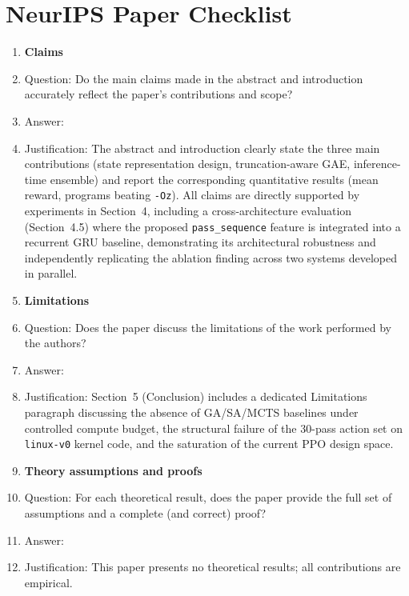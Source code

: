 \section*{NeurIPS Paper Checklist}

\begin{enumerate}

\item {\bf Claims}
    \item[] Question: Do the main claims made in the abstract and introduction accurately reflect the paper's contributions and scope?
    \item[] Answer: \answerYes{}
    \item[] Justification: The abstract and introduction clearly state the three main contributions (state representation design, truncation-aware GAE, inference-time ensemble) and report the corresponding quantitative results (mean reward, programs beating \texttt{-Oz}). All claims are directly supported by experiments in Section~4, including a cross-architecture evaluation (Section~4.5) where the proposed \texttt{pass\_sequence} feature is integrated into a recurrent GRU baseline, demonstrating its architectural robustness and independently replicating the ablation finding across two systems developed in parallel.
    
\item {\bf Limitations}
    \item[] Question: Does the paper discuss the limitations of the work performed by the authors?
    \item[] Answer: \answerYes{}
    \item[] Justification: Section~5 (Conclusion) includes a dedicated Limitations paragraph discussing the absence of GA/SA/MCTS baselines under controlled compute budget, the structural failure of the 30-pass action set on \texttt{linux-v0} kernel code, and the saturation of the current PPO design space.

\item {\bf Theory assumptions and proofs}
    \item[] Question: For each theoretical result, does the paper provide the full set of assumptions and a complete (and correct) proof?
    \item[] Answer: \answerNA{}
    \item[] Justification: This paper presents no theoretical results; all contributions are empirical.


\end{enumerate}
